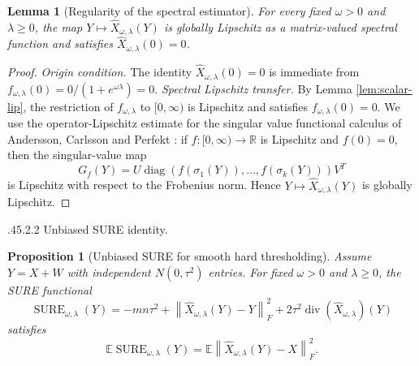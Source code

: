 \documentclass[12pt,reqno]{amsart}
\makeatletter
\numberwithin{equation}{section}
\def\paragraph{\@startsection{paragraph}{4}{\z@}%
  {.45\linespacing\@plus.2\linespacing}{.2\linespacing}%
  {\normalfont\bfseries}}
\theoremstyle{plain}
\newtheorem{lemma}[theorem]{Lemma}
\newtheorem{proposition}[theorem]{Proposition}
\theoremstyle{definition}
\newcommand{\diagop}{\operatorname{diag}}
\newcommand{\divop}{\operatorname{div}}
\newcommand{\R}{\mathbb{R}}
\newcommand{\E}{\mathbb{E}}
\newcommand{\norm}[1]{\left\lVert #1\right\rVert}
\makeatother
\begin{document}
\begin{lemma}[Regularity of the spectral estimator]\label{lem:spectral-lip}
For every fixed $\omega>0$ and $\lambda\geq0$, the map $Y\mapsto\widehat X_{\omega,\lambda}(Y)$ is globally Lipschitz as a matrix-valued spectral function and satisfies $\widehat X_{\omega,\lambda}(0)=0$.
\end{lemma}

\begin{proof}
\emph{Origin condition.} The identity $\widehat X_{\omega,\lambda}(0)=0$ is immediate from $f_{\omega,\lambda}(0)=0/(1+e^{\omega\lambda})=0$. \emph{Spectral Lipschitz transfer.} By Lemma \ref{lem:scalar-lip}, the restriction of $f_{\omega,\lambda}$ to $[0,\infty)$ is Lipschitz and satisfies $f_{\omega,\lambda}(0)=0$. We use the operator-Lipschitz estimate for the singular value functional calculus of Andersson, Carlsson and Perfekt \cite{andersson2016operator}: if $f:[0,\infty)\to\R$ is Lipschitz and $f(0)=0$, then the singular-value map
\begin{equation}
    G_f(Y)=U\diagop(f(\sigma_1(Y)),\ldots,f(\sigma_k(Y)))V^T
\end{equation}
is Lipschitz with respect to the Frobenius norm. Hence $Y\mapsto\widehat X_{\omega,\lambda}(Y)$ is globally Lipschitz.
\end{proof}

\paragraph{Unbiased SURE identity.}
\begin{proposition}[Unbiased SURE for smooth hard thresholding]\label{prop:sure-unbiased}
Assume $Y=X+W$ with independent $N(0,\tau^2)$ entries. For fixed $\omega>0$ and $\lambda\geq0$, the SURE functional
\begin{equation}\label{eq:sure-general}
    \operatorname{SURE}_{\omega,\lambda}(Y)
    =-mn\tau^2+\norm{\widehat X_{\omega,\lambda}(Y)-Y}_{F}^{2}
    +2\tau^2\divop(\widehat X_{\omega,\lambda})(Y)
\end{equation}
satisfies
\begin{equation}
    \E\operatorname{SURE}_{\omega,\lambda}(Y)
    =\E\norm{\widehat X_{\omega,\lambda}(Y)-X}_{F}^{2}.
\end{equation}
\end{proposition}
\end{document}
